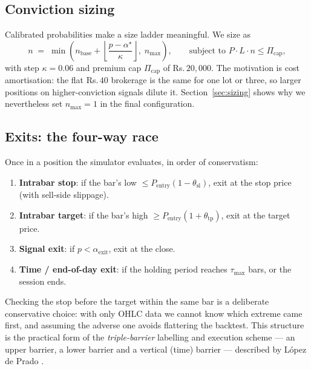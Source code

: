 \documentclass[11pt,a4paper]{article}
\newcommand{\rs}{Rs.\,}                 %
\begin{document}
\subsection{Conviction sizing}

Calibrated probabilities make a size ladder meaningful. We size as
\begin{equation}
n \;=\; \min\!\left(n_{\text{base}} +
\left\lfloor \frac{p - \alpha^{\star}}{\kappa} \right\rfloor,\; n_{\max}\right),
\qquad
\text{subject to } P\cdot L \cdot n \le \Pi_{\text{cap}},
\label{eq:sizing}
\end{equation}
with step $\kappa = 0.06$ and premium cap $\Pi_{\text{cap}}$ of \rs$20{,}000$. The
motivation is cost amortisation: the flat \rs$40$ brokerage is the same for one lot or
three, so larger positions on higher-conviction signals dilute it. Section~\ref{sec:sizing}
shows why we nevertheless set $n_{\max}=1$ in the final configuration.

\subsection{Exits: the four-way race}

Once in a position the simulator evaluates, in order of conservatism:
\begin{enumerate}
  \item \textbf{Intrabar stop}: if the bar's low $\le P_{\text{entry}}(1-\theta_{\text{sl}})$,
        exit at the stop price (with sell-side slippage).
  \item \textbf{Intrabar target}: if the bar's high $\ge P_{\text{entry}}(1+\theta_{\text{tp}})$,
        exit at the target price.
  \item \textbf{Signal exit}: if $p < \alpha_{\text{exit}}$, exit at the close.
  \item \textbf{Time / end-of-day exit}: if the holding period reaches
        $\tau_{\max}$ bars, or the session ends.
\end{enumerate}
Checking the stop before the target within the same bar is a deliberate conservative
choice: with only OHLC data we cannot know which extreme came first, and assuming the
adverse one avoids flattering the backtest. This structure is the practical form of the
\emph{triple-barrier} labelling and execution scheme --- an upper barrier, a lower
barrier and a vertical (time) barrier --- described by López de Prado
\cite{lopezdeprado,darufinance}.
\end{document}
